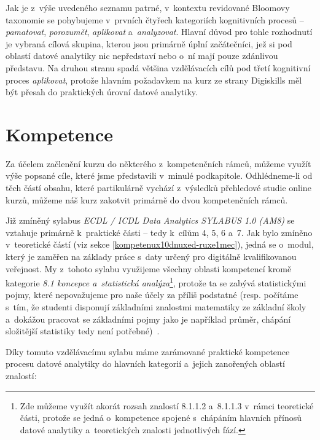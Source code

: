 Jak je z~výše uvedeného seznamu patrné, v~kontextu revidované Bloomovy taxonomie se pohybujeme v~prvních čtyřech kategoriích kognitivních procesů -- \emph{pamatovat}, \emph{porozumět}, \emph{aplikovat} a~\emph{analyzovat}. Hlavní důvod pro tohle rozhodnutí je vybraná cílová skupina, kterou jsou primárně úplní začátečníci, jež si pod oblastí datové analytiky nic nepředstaví nebo o~ní mají pouze zdánlivou představu. Na druhou stranu spadá většina vzdělávacích cílů pod třetí kognitivní proces \emph{aplikovat}, protože hlavním požadavkem na kurz ze strany Digiskills měl být přesah do praktických úrovní datové analytiky.

\hypertarget{kompetence}{%
\section{Kompetence}\label{kompetence}}

Za účelem začlenění kurzu do některého z~kompetenčních rámců, můžeme využít výše popsané cíle, které jsme představili v~minulé podkapitole. Odhlédneme-li od těch částí obsahu, které partikulárně vychází z~výsledků přehledové studie online kurzů, můžeme náš kurz zakotvit primárně do dvou kompetenčních rámců.

Již zmíněný sylabus \emph{ECDL / ICDL Data Analytics SYLABUS 1.0 (AM8)} se vztahuje primárně k~praktické části -- tedy k~cílům 4, 5, 6 a~7. Jak bylo zmíněno v~teoretické částí (viz sekce \ref{kompetenux10dnuxed-ruxe1mec}), jedná se o~modul, který je zaměřen na základy práce s~daty určený pro digitálně kvalifikovanou veřejnost. My z~tohoto sylabu využijeme všechny oblasti kompetencí kromě kategorie \emph{8.1 koncepce a~statistická analýza}\footnote{Zde můžeme využít akorát rozsah znalostí 8.1.1.2 a~8.1.1.3 v~rámci teoretické části, protože se jedná o~kompetence spojené s~chápáním hlavních přínosů datové analytiky a~teoretických znalosti jednotlivých fází.}, protože ta se zabývá statistickými pojmy, které nepovažujeme pro naše účely za příliš podstatné (resp. počítáme s~tím, že studenti disponují základními znalostmi matematiky ze základní školy a~dokážou pracovat se základními pojmy jako je například průměr, chápání složitější statistiky tedy není potřebné)~\parencite{ecdl17}.

Díky tomuto vzdělávacímu sylabu máme zarámované praktické kompetence procesu datové analytiky do hlavních kategorií a~jejich zanořených oblastí znalostí:

